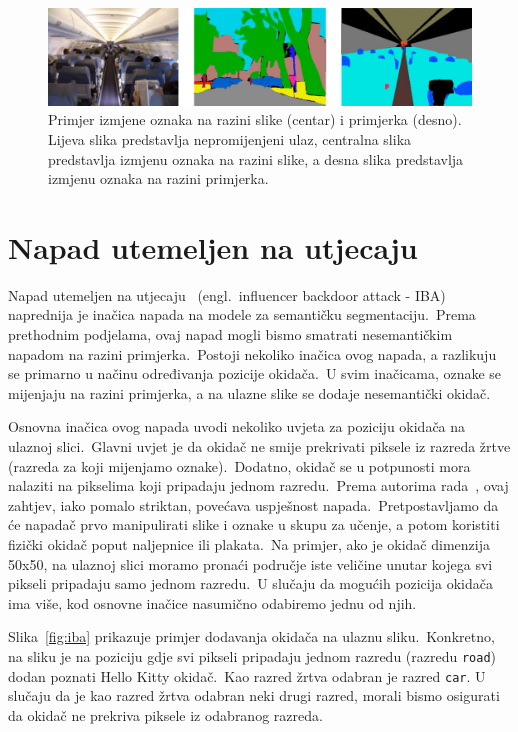 \documentclass[times, utf8, seminar, numeric]{fer}
\begin{document}
\begin{figure}[h]
    \centering
    \includegraphics[scale=0.45]{./Slike/badnets_finegrained.png}
    \caption{Primjer izmjene oznaka na razini slike (centar) i primjerka (desno). Lijeva slika predstavlja nepromijenjeni ulaz, centralna slika predstavlja izmjenu oznaka na razini slike, a desna slika predstavlja izmjenu oznaka na razini primjerka.}
    \label{fig:badnets_finegrained}
\end{figure}

\section{Napad utemeljen na utjecaju}

Napad utemeljen na utjecaju~\cite{lan2023influencer} (engl.\ influencer backdoor attack - IBA) naprednija je inačica napada na modele za semantičku segmentaciju.\ 
Prema prethodnim podjelama, ovaj napad mogli bismo smatrati nesemantičkim napadom na razini primjerka.\ 
Postoji nekoliko inačica ovog napada, a razlikuju se primarno u načinu određivanja pozicije okidača.\ 
U svim inačicama, oznake se mijenjaju na razini primjerka, a na ulazne slike se dodaje nesemantički okidač.\ 
  
Osnovna inačica ovog napada uvodi nekoliko uvjeta za poziciju okidača na ulaznoj slici.\ 
Glavni uvjet je da okidač ne smije prekrivati piksele iz razreda žrtve (razreda za koji mijenjamo oznake).\ 
Dodatno, okidač se u potpunosti mora nalaziti na pikselima koji pripadaju jednom razredu.\ 
Prema autorima rada~\cite{lan2023influencer}, ovaj zahtjev, iako pomalo striktan, povećava uspješnost napada.\
Pretpostavljamo da će napadač prvo manipulirati slike i oznake u skupu za učenje, a potom koristiti fizički okidač poput naljepnice ili plakata.\
Na primjer, ako je okidač dimenzija 50x50, na ulaznoj slici moramo pronaći područje iste veličine unutar kojega svi pikseli pripadaju samo jednom razredu.\ 
U slučaju da mogućih pozicija okidača ima više, kod osnovne inačice nasumično odabiremo jednu od njih.\ 
  
Slika~\ref{fig:iba} prikazuje primjer dodavanja okidača na ulaznu sliku.\ 
Konkretno, na sliku je na poziciju gdje svi pikseli pripadaju jednom razredu (razredu \texttt{road}) dodan poznati Hello Kitty okidač.\ 
Kao razred žrtva odabran je razred \texttt{car}. U slučaju da je kao razred žrtva odabran neki drugi razred, morali bismo osigurati da okidač ne prekriva piksele iz odabranog razreda.\ 
\end{document}
